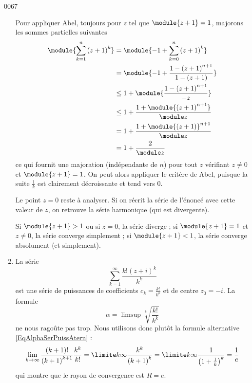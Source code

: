 \begin{corrige}{0067}
\begin{enumerate}
Pour appliquer Abel, toujours pour $z$ tel que $\module{z+1} = 1$,
majorons les sommes partielles suivantes
\begin{equation*}
\begin{split}
\module{\sum_{k=1}^n {(z+1)}^k} &= \module{-1 + \sum_{k=0}^n
{(z+1)}^k}\\
&= \module{-1 + \frac{1 - {(z+1)}^{n+1}}{1 - (z + 1)}}\\
&\leq 1 + \module{\frac{1 - {(z+1)}^{n+1}}{-z}}\\
&\leq 1 + \frac{1 + \module{{(z+1)}^{n+1}}}{\module z}\\
&= 1 + \frac{1 + {\module{(z+1)}}^{n+1}}{\module z}\\
&= 1 + \frac{2}{\module z}
\end{split}
\end{equation*}
ce qui fournit une majoration (indépendante de $n$) pour tout $z$ vérifiant $z \neq 0$ et $\module{z+1}= 1$. On peut alors appliquer le critère de Abel, puisque la suite $\frac{1}{k}$ est clairement décroissante et tend vers $0$.

Le point $z = 0$ reste à analyser. Si on récrit la série de l'énoncé avec cette valeur de $z$, on retrouve la série harmonique (qui est divergente).

\conclusion
Si $\module{z+1} > 1$ ou si $z = 0$, la série diverge ; si $\module{z+1} = 1$ et $z \neq 0$, la série converge simplement ; si $\module{z+1} < 1$, la série converge absolument (et simplement).

\item 
La série
\begin{equation}\label{eqseriepuissances-exo-c}
	\sum_{k=1}^\infty \frac{k! {(z+i)}^k}{k^k}
\end{equation}
est une série de puissances de coefficients $c_k = \frac{ k! }{ k^k }$ et de centre $z_0 = -i$. La formule
\begin{equation}
	\alpha=\limsup\sqrt[k]{\frac{ k! }{ k^k }}
\end{equation}
ne nous ragoûte pas trop. Nous utilisons donc plutôt la formule alternative \eqref{EqAlphaSerPuissAtern} :
\begin{equation}
	\lim_{k\to \infty} \frac{(k+1)!}{{(k+1)}^{k+1}}\frac{k^k}{k!} = \limite k
	\infty \frac{k^k}{{(k+1)}^k} = \limite k \infty
	\frac{1}{{\left(1+\frac{1}{k}\right)}^k} = \frac 1 {e}
\end{equation}
qui montre que le rayon de convergence est $R = e$.


\end{enumerate}
\end{corrige}
